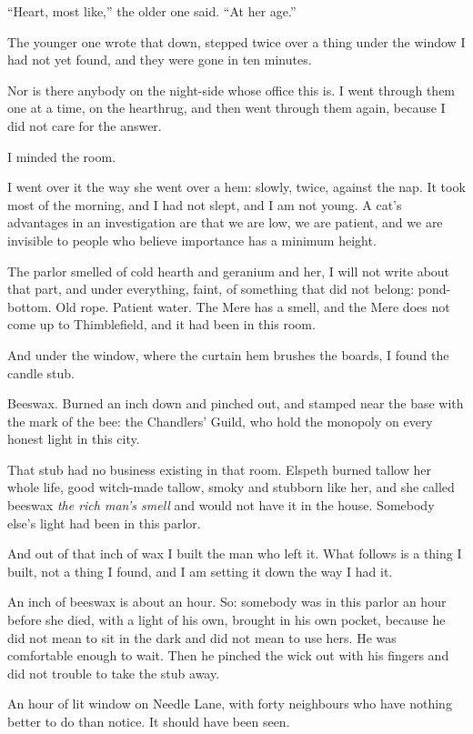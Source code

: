 ``Heart, most like,'' the older one said. ``At her age.''

The younger one wrote that down, stepped twice over a thing under the window I had not yet found, and they were gone in ten minutes.

Nor is there anybody on the night-side whose office this is. I went through them one at a time, on the hearthrug, and then went through them again, because I did not care for the answer.

\scenebreak

I minded the room.

I went over it the way she went over a hem: slowly, twice, against the nap. It took most of the morning, and I had not slept, and I am not young. A cat's advantages in an investigation are that we are low, we are patient, and we are invisible to people who believe importance has a minimum height.

The parlor smelled of cold hearth and geranium and her, I will not write about that part, and under everything, faint, of something that did not belong: pond-bottom. Old rope. Patient water. The Mere has a smell, and the Mere does not come up to Thimblefield, and it had been in this room.

And under the window, where the curtain hem brushes the boards, I found the candle stub.

Beeswax. Burned an inch down and pinched out, and stamped near the base with the mark of the bee: the Chandlers' Guild, who hold the monopoly on every honest light in this city.

That stub had no business existing in that room. Elspeth burned tallow her whole life, good witch-made tallow, smoky and stubborn like her, and she called beeswax \emph{the rich man's smell} and would not have it in the house. Somebody else's light had been in this parlor.

And out of that inch of wax I built the man who left it. What follows is a thing I built, not a thing I found, and I am setting it down the way I had it.

An inch of beeswax is about an hour. So: somebody was in this parlor an hour before she died, with a light of his own, brought in his own pocket, because he did not mean to sit in the dark and did not mean to use hers. He was comfortable enough to wait. Then he pinched the wick out with his fingers and did not trouble to take the stub away.

An hour of lit window on Needle Lane, with forty neighbours who have nothing better to do than notice. It should have been seen.

